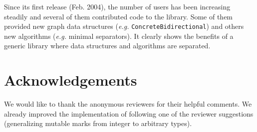 Since its first release (Feb. 2004), the number of \ocamlgraph users
has been increasing steadily and several of them contributed code to
the library. Some of them provided new graph data structures
(\emph{e.g.}  \texttt{ConcreteBidirectional}) and others new
algorithms (\emph{e.g.} minimal separators). It clearly shows the
benefits of a generic library where data structures and algorithms are
separated.


\section*{Acknowledgements}

We would like to thank the anonymous reviewers for their helpful
comments. We already improved the implementation of \ocamlgraph
following one of the reviewer suggestions (generalizing mutable marks
from integer to arbitrary types).



 

\appendix
